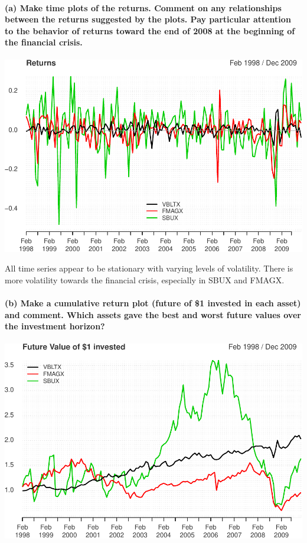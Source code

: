 \documentclass[]{article}
\let\oldparagraph\paragraph
\renewcommand{\paragraph}[1]{\oldparagraph{#1}\mbox{}}
\begin{document}
\paragraph{(a) Make time plots of the returns. Comment on any
relationships between the returns suggested by the plots. Pay particular
attention to the behavior of returns toward the end of 2008 at the
beginning of the financial
crisis.}\label{a-make-time-plots-of-the-returns.-comment-on-any-relationships-between-the-returns-suggested-by-the-plots.-pay-particular-attention-to-the-behavior-of-returns-toward-the-end-of-2008-at-the-beginning-of-the-financial-crisis.}

\includegraphics{homework_4_markdown_files/figure-latex/unnamed-chunk-5-1.pdf}

All time series appear to be stationary with varying levels of
volatility. There is more volatility towards the financial crisis,
especially in SBUX and FMAGX.

\paragraph{(b) Make a cumulative return plot (future of \$1 invested in
each asset) and comment. Which assets gave the best and worst future
values over the investment
horizon?}\label{b-make-a-cumulative-return-plot-future-of-1-invested-in-each-asset-and-comment.-which-assets-gave-the-best-and-worst-future-values-over-the-investment-horizon}

\includegraphics{homework_4_markdown_files/figure-latex/unnamed-chunk-6-1.pdf}
\end{document}
